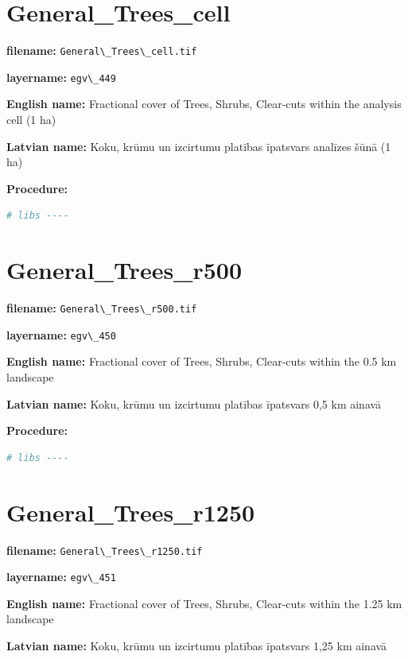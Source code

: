 \documentclass[
]{book}
\newcommand{\passthrough}[1]{#1}
\begin{document}
\section{General\_Trees\_cell}\label{ch06.449}

\textbf{filename:} \passthrough{\lstinline!General\_Trees\_cell.tif!}

\textbf{layername:} \passthrough{\lstinline!egv\_449!}

\textbf{English name:} Fractional cover of Trees, Shrubs, Clear-cuts within the analysis cell (1 ha)

\textbf{Latvian name:} Koku, krūmu un izcirtumu platības īpatsvars analīzes šūnā (1 ha)

\textbf{Procedure:}

\begin{lstlisting}[language=R]
# libs ----
\end{lstlisting}

\section{General\_Trees\_r500}\label{ch06.450}

\textbf{filename:} \passthrough{\lstinline!General\_Trees\_r500.tif!}

\textbf{layername:} \passthrough{\lstinline!egv\_450!}

\textbf{English name:} Fractional cover of Trees, Shrubs, Clear-cuts within the 0.5 km landscape

\textbf{Latvian name:} Koku, krūmu un izcirtumu platības īpatsvars 0,5 km ainavā

\textbf{Procedure:}

\begin{lstlisting}[language=R]
# libs ----
\end{lstlisting}

\section{General\_Trees\_r1250}\label{ch06.451}

\textbf{filename:} \passthrough{\lstinline!General\_Trees\_r1250.tif!}

\textbf{layername:} \passthrough{\lstinline!egv\_451!}

\textbf{English name:} Fractional cover of Trees, Shrubs, Clear-cuts within the 1.25 km landscape

\textbf{Latvian name:} Koku, krūmu un izcirtumu platības īpatsvars 1,25 km ainavā
\end{document}
